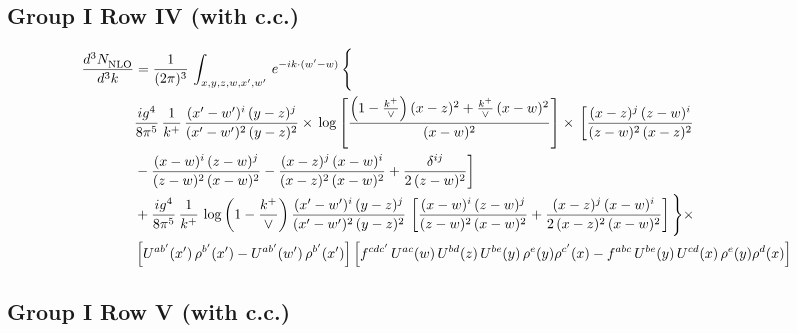 \documentclass[10pt]{article}
\numberwithin{equation}{section}
\begin{document}
\subsection{Group I Row IV (with c.c.)}
\begin{align}
    \frac{d^{3}N_{\rm NLO}^{\rm}}{d^{3}k}  & =   \frac{1}{(2\pi)^{3}}\,
    \int_{x,y,z,w,x',w'}\,e^{-ik\cdot (w^\prime-w)}\,\Bigg\{\notag \\
& \frac{ig^{4}}{8\pi^{5}}\,\frac{1}{k^{+}}\,\frac{(x'-w')^{i}\,(y-z)^{j}}{(x'-w')^{2}\,(y-z)^{2}}\times\,\log{\left[\frac{\left(1-\frac{k^{+}}{\vee}\right)(x-z)^{2}+\frac{k^{+}}{\vee}\,(x-w)^{2}}{(x-w)^{2}}\right]}\times\, \bigg[\frac{(x-z)^{j}\,(z-w)^{i}}{(z-w)^{2}\,(x-z)^{2}}\notag \\ & -\frac{(x-w)^{i}\,(z-w)^{j}}{(z-w)^{2}\,(x-w)^{2}}-\frac{(x-z)^{j}\,(x-w)^{i}}{(x-z)^{2}\,(x-w)^{2}}+\frac{\delta^{ij}}{2\,(z-w)^{2}}\bigg] \notag \\
& + \frac{ig^{4}}{8\pi^{5}}\,\frac{1}{k^{+}}\,\log{\left(1-\frac{k^{+}}{\vee}\right)}\,\frac{(x'-w')^{i}\,(y-z)^{j}}{(x'-w')^{2}\,(y-z)^{2}}\,\left[\frac{(x-w)^{i}\,(z-w)^{j}}{(z-w)^{2}\,(x-w)^{2}}+\frac{(x-z)^{j}\,(x-w)^{i}}{2\, (x-z)^{2}\,(x-w)^{2}}\right]\Bigg\}\times\notag \\ &  \left[U^{ab'}(x')\,\rho^{b'}(x')-U^{ab'}(w')\,\rho^{b'}(x')\right] \left[f^{cdc'}\,U^{ac}(w)\,U^{bd}(z)\,U^{be}(y)\,\rho^{e}(y)\rho^{c'}(x)-f^{abc}\,U^{be}(y)\,U^{cd}(x)\,\rho^{e}(y)\rho^{d}(x)\right]
\end{align}

\subsection{Group I Row V (with c.c.)}
\end{document}
